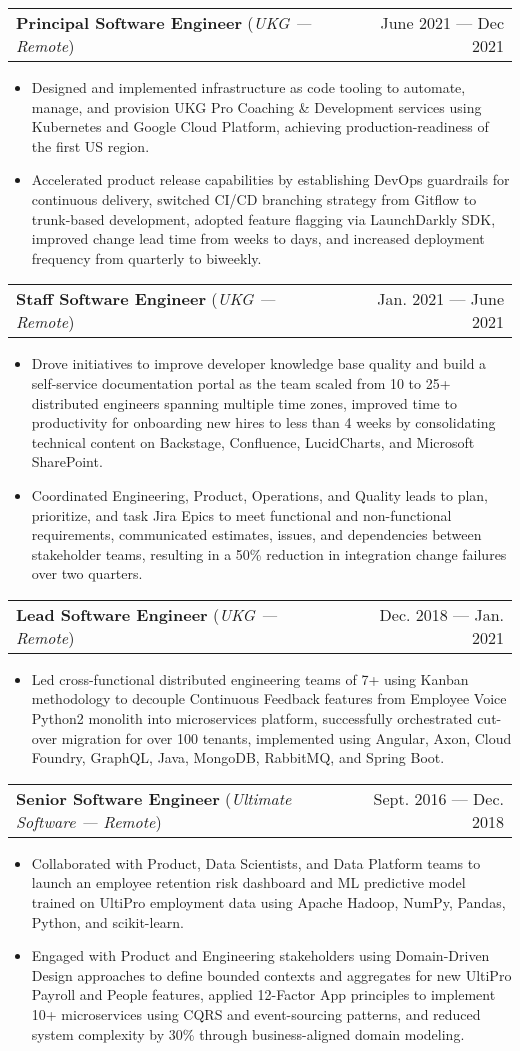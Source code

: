 \documentclass[letterpaper,10pt]{article}
\makeatletter
\newcommand{\experienceHeading}[4]{
  \vspace{-2pt}\item
    \begin{tabular*}{\textwidth}[t]{l@{\extracolsep{\fill}}r}
      \textbf{#1} (\textit{\small#3 --- \textit{\small #4}})& #2 \\
    \end{tabular*}\vspace{-6pt}
}
\newcommand{\experienceStart}{\begin{itemize}[leftmargin=16pt, rightmargin=8pt]}
\newcommand{\experienceEnd}{\end{itemize}\vspace{-7pt}}
\newcommand{\experience}[1]{\item\small{{#1 \vspace{-0.5pt}}}}
\makeatother
\begin{document}
  \experienceHeading{Principal Software Engineer}
    {June 2021 --- Dec 2021}
    {UKG}
    {Remote}
  \experienceStart{}
    \experience{
      Designed and implemented infrastructure as code tooling to automate, manage, and provision UKG Pro Coaching \& Development services using Kubernetes and Google Cloud Platform, achieving production-readiness of the first US region.
    }
    \experience{
      Accelerated product release capabilities by establishing DevOps guardrails for continuous delivery, switched CI/CD branching strategy from Gitflow to trunk-based development, adopted feature flagging via LaunchDarkly SDK, improved change lead time from weeks to days, and increased deployment frequency from quarterly to biweekly.
    }
  \experienceEnd{}

  \experienceHeading{Staff Software Engineer}
    {Jan. 2021 --- June 2021}
    {UKG}
    {Remote}
  \experienceStart{}
    \experience{
      Drove initiatives to improve developer knowledge base quality and build a self-service documentation portal as the team scaled from 10 to 25+ distributed engineers spanning multiple time zones, improved time to productivity for onboarding new hires to less than 4 weeks by consolidating technical content on Backstage, Confluence, LucidCharts, and Microsoft SharePoint.
    }
    \experience{
      Coordinated Engineering, Product, Operations, and Quality leads to plan, prioritize, and task Jira Epics to meet functional and non-functional requirements, communicated estimates, issues, and dependencies between stakeholder teams, resulting in a 50\% reduction in integration change failures over two quarters.
    }
  \experienceEnd{}

  \experienceHeading{Lead Software Engineer}
    {Dec. 2018 --- Jan. 2021}
    {UKG}
    {Remote}
  \experienceStart{}
    \experience{
      Led cross-functional distributed engineering teams of 7+ using Kanban methodology to decouple Continuous Feedback features from Employee Voice Python2 monolith into microservices platform, successfully orchestrated cut-over migration for over 100 tenants, implemented using Angular, Axon, Cloud Foundry, GraphQL, Java, MongoDB, RabbitMQ, and Spring Boot.
    }
  \experienceEnd{}

  \experienceHeading{Senior Software Engineer}
    {Sept. 2016 --- Dec. 2018}
    {Ultimate Software}
    {Remote}
  \experienceStart{}
    \experience{
      Collaborated with Product, Data Scientists, and Data Platform teams to launch an employee retention risk dashboard and ML predictive model trained on UltiPro employment data using Apache Hadoop, NumPy, Pandas, Python, and scikit-learn.
    }
    \experience{
      Engaged with Product and Engineering stakeholders using Domain-Driven Design approaches to define bounded contexts and aggregates for new UltiPro Payroll and People features, applied 12-Factor App principles to implement 10+ microservices using CQRS and event-sourcing patterns, and reduced system complexity by 30\% through business-aligned domain modeling.
    }
  \experienceEnd{}
\end{document}
